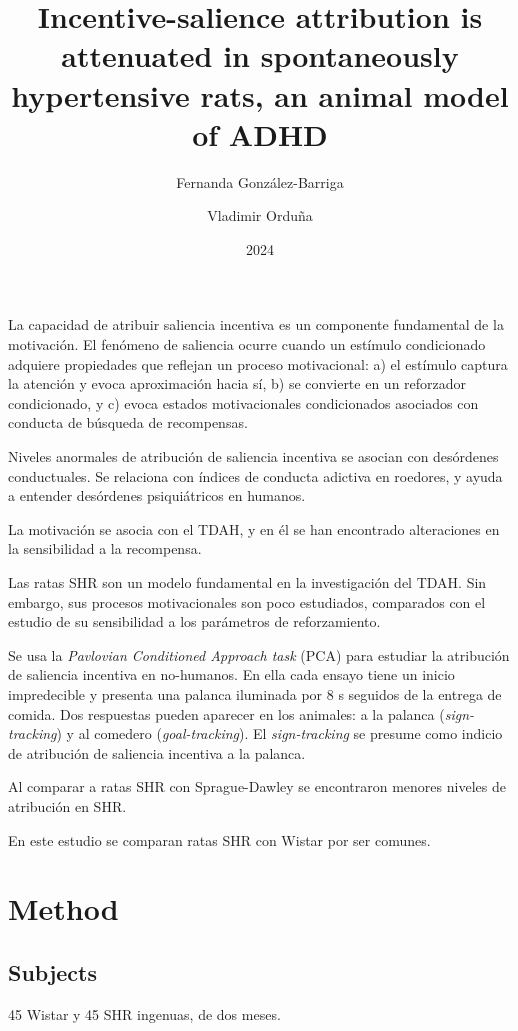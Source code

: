 \documentclass[a4paper,12pt]{article}
\title{Incentive-salience attribution is attenuated in spontaneously hypertensive rats, an animal model of ADHD}
\author{Fernanda González-Barriga \and Vladimir Orduña}
\date{2024}
\begin{document}
{\scshape\bfseries \maketitle}

La capacidad de atribuir saliencia incentiva es un componente fundamental de la motivación.
El fenómeno de saliencia ocurre cuando un estímulo condicionado adquiere propiedades que reflejan un proceso motivacional: a) el estímulo captura la atención y evoca aproximación hacia sí, b) se convierte en un reforzador condicionado, y c) evoca estados motivacionales condicionados asociados con conducta de búsqueda de recompensas.

Niveles anormales de atribución de saliencia incentiva se asocian con desórdenes conductuales.
Se relaciona con índices de conducta adictiva en roedores, y ayuda a entender desórdenes psiquiátricos en humanos.

La motivación se asocia con el TDAH, y en él se han encontrado alteraciones en la sensibilidad a la recompensa.

Las ratas SHR son un modelo fundamental en la investigación del TDAH.
Sin embargo, sus procesos motivacionales son poco estudiados, comparados con el estudio de su sensibilidad a los parámetros de reforzamiento.

Se usa la {\itshape Pavlovian Conditioned Approach task} (PCA) para estudiar la atribución de saliencia incentiva en no-humanos.
En ella cada ensayo tiene un inicio impredecible y presenta una palanca iluminada por 8 s seguidos de la entrega de comida.
Dos respuestas pueden aparecer en los animales: a la palanca ({\itshape sign-tracking}) y al comedero ({\itshape goal-tracking}).
El {\itshape sign-tracking} se presume como indicio de atribución de saliencia incentiva a la palanca.

Al comparar a ratas SHR con Sprague-Dawley se encontraron menores niveles de atribución en SHR.

En este estudio se comparan ratas SHR con Wistar por ser comunes.

\section{Method}

\subsection{Subjects}

45 Wistar y 45 SHR ingenuas, de dos meses.
\end{document}
